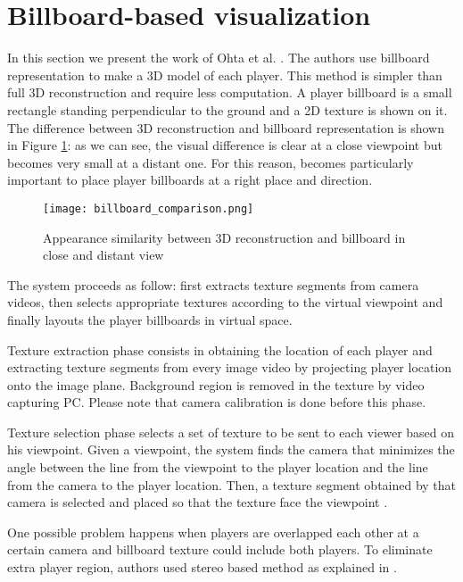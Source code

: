 \section{Billboard-based visualization}
In this section we present the work of Ohta et al. \cite{03_billboard}.
The authors use billboard representation to make a 3D model of each player.
This method is simpler than full 3D reconstruction and require less computation.
A player billboard is a small rectangle standing perpendicular to the ground
and a 2D texture is shown on it.
The difference between 3D reconstruction and billboard representation is shown in Figure \ref{fig:billboard_comparison}:
as we can see, the visual difference is clear at a close viewpoint but becomes very small at a distant one.
For this reason, becomes particularly important to place player billboards at a right place and direction.

\begin{figure}[htbp]
\centerline{\texttt{[image: billboard\_comparison.png]}}
\caption{Appearance similarity between 3D reconstruction and billboard in close and distant view \cite{03_billboard}}
\label{fig:billboard_comparison}
\end{figure}


The system proceeds as follow: first extracts texture segments from camera videos, then selects appropriate textures according
to the virtual viewpoint and finally layouts the player billboards in virtual space.

Texture extraction phase consists in obtaining the location of each player and extracting texture segments from every image 
video by projecting player location onto the image plane.
Background region is removed in the texture by video capturing PC.
Please note that camera calibration is done before this phase.

Texture selection phase selects a set of texture to be sent to each viewer based on his viewpoint. 
Given a viewpoint, the system finds the camera that minimizes the angle between the line from the viewpoint to the player 
location and the line from the camera to the player location. Then, a texture segment obtained by that camera is selected 
and placed so that the texture face the viewpoint \cite{03_billboard}.


One possible problem happens when players are overlapped each other at a certain camera and billboard texture could include both
players.
To eliminate extra player region, authors used stereo based method \cite{03_billboard_04} as explained in \cite{03_billboard}. 

